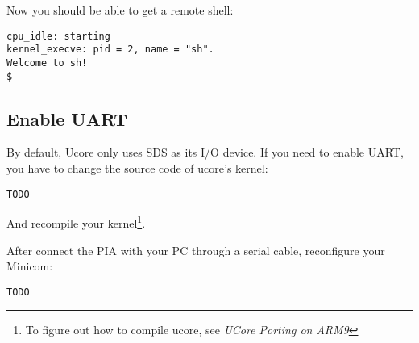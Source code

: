 \documentclass[a4paper]{article}
\begin{document}
Now you should be able to get a remote shell:
\begin{verbatim}
cpu_idle: starting
kernel_execve: pid = 2, name = "sh".
Welcome to sh!
$                                   
\end{verbatim}

\subsection{Enable UART}
By default, Ucore only uses SDS as its I/O device. If you need
to enable UART, you have to change the source code of ucore's kernel:

\begin{verbatim}
TODO
\end{verbatim}

And recompile your kernel\footnote{To figure out how to compile
ucore, see \emph{UCore Porting on ARM9}}.

After connect the PIA with your PC through a serial cable, 
reconfigure your Minicom:

\begin{verbatim}
TODO
\end{verbatim}
\end{document}
